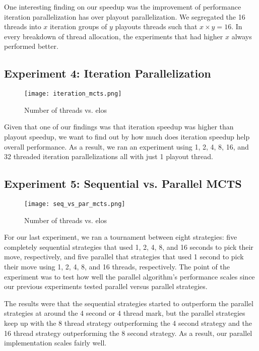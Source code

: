 \documentclass[11pt]{article}
\begin{document}
One interesting finding on our speedup was the improvement of performance iteration parallelization has over playout parallelization. We segregated the 16 threads into $x$ iteration groups of $y$ playouts threads such that $x \times y = 16$. In every breakdown of thread allocation, the experiments that had higher $x$ always performed better. 

\subsection*{Experiment 4: Iteration Parallelization}
\begin{figure}[h!]
\begin{center}
\texttt{[image: iteration\_mcts.png]}
\caption{Number of threads vs. elos}
\end{center}
\end{figure}

Given that one of our findings was that iteration speedup was higher than playout speedup, we want to find out by how much does iteration speedup help overall performance. As a result, we ran an experiment using 1, 2, 4, 8, 16, and 32 threaded iteration parallelizations all with just 1 playout thread. 


\subsection*{Experiment 5: Sequential vs. Parallel MCTS}
\begin{figure}[ht!]
\begin{center}
\texttt{[image: seq\_vs\_par\_mcts.png]}
\caption{Number of threads vs. elos}
\end{center}
\end{figure}
For our last experiment, we ran a tournament between eight strategies: five completely sequential strategies that used 1, 2, 4, 8, and 16 seconds to pick their move, respectively, and five parallel that strategies that used 1 second to pick their move using 1, 2, 4, 8, and 16 threads, respectively. The point of the experiment was to test how well the parallel algorithm's performance scales since our previous experiments tested parallel versus parallel strategies. 

The results were that the sequential strategies started to outperform the parallel strategies at around the 4 second or 4 thread mark, but the parallel strategies keep up with the 8 thread strategy outperforming the 4 second strategy and the 16 thread strategy outperforming the 8 second strategy. As a result, our parallel implementation scales fairly well.
\end{document}
